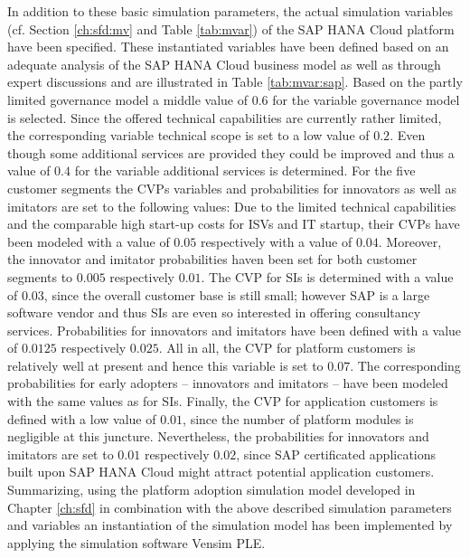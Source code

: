 In addition to these basic simulation parameters, the actual simulation variables (cf. Section \ref{ch:sfd:mv} and Table \ref{tab:mvar}) of the SAP HANA Cloud platform have been specified. These instantiated variables have been defined based on an adequate analysis of the SAP HANA Cloud business model as well as through expert discussions and are illustrated in Table \ref{tab:mvar:sap}. Based on the partly limited governance model a middle value of $0.6$ for the variable governance model is selected. Since the offered technical capabilities are currently rather limited, the corresponding variable technical scope is set to a low value of $0.2$. Even though some additional services are provided they could be improved and thus a value of $0.4$ for the variable additional services is determined. For the five customer segments the \acp{CVP} variables and probabilities for innovators as well as imitators are set to the following values: Due to the limited technical capabilities and the comparable high start-up costs for \acp{ISV} and \ac{IT} startup, their \acp{CVP} have been modeled with a value of $0.05$ respectively with a value of $0.04$. Moreover, the innovator and imitator probabilities haven been set for both customer segments to $0.005$ respectively $0.01$. The \ac{CVP} for \acp{SI} is determined with a value of $0.03$, since the overall customer base is still small; however SAP is a large software vendor and thus \acp{SI} are even so interested in offering consultancy services. Probabilities for innovators and imitators have been defined with a value of $0.0125$ respectively $0.025$. All in all, the \ac{CVP} for platform customers is relatively well at present and hence this variable is set to $0.07$. The corresponding probabilities for early adopters -- innovators and imitators -- have been modeled with the same values as for \acp{SI}. Finally, the \ac{CVP} for application customers is defined with a low value of $0.01$, since the number of platform modules is negligible at this juncture. Nevertheless, the probabilities for innovators and imitators are set to $0.01$ respectively $0.02$, since SAP certificated applications built upon SAP HANA Cloud might attract potential application customers. Summarizing, using the platform adoption simulation model developed in Chapter \ref{ch:sfd} in combination with the above described simulation parameters and variables an instantiation of the simulation model has been implemented by applying the simulation software Vensim \acs{PLE}.

